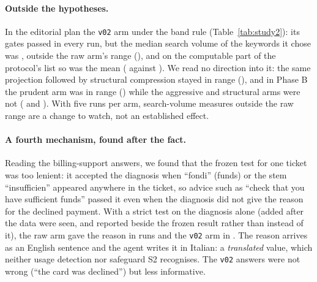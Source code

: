 \paragraph{Outside the hypotheses.} In the editorial plan the \texttt{v02} arm \StudyTwoVtwoHoldsi{} under the band rule
(Table~\ref{tab:study2}): its gates passed in every run, but the median search volume of the keywords it chose was
\StudyTwoVtwoMedianVolumei, outside the raw arm's range (\StudyTwoRawBandVolumei), and on the computable part of the
protocol's list so was the mean (\StudyTwoVtwoMeanVolumei{} against \StudyTwoRawBandMeanVolumei). We read no direction into it: the
same projection followed by structural compression stayed in range (\StudyTwoVtwostructuralMedianVolumei), and in
Phase B the prudent arm was in range (\PhaseBPrudentMedianVolumei) while the aggressive and structural arms were not
(\PhaseBAggressiveMedianVolumei{} and \PhaseBStructuralMedianVolumei). With five runs per arm, search-volume measures
outside the raw range are a change to watch, not an established effect.

\paragraph{A fourth mechanism, found after the fact.} Reading the billing-support answers, we found that the
frozen test for one ticket was too lenient: it accepted the diagnosis when ``fondi'' (funds) or the stem
``insufficien'' appeared anywhere in the ticket, so advice such as ``check that you have sufficient funds'' passed it even when the diagnosis did not
give the reason for the declined payment. With a strict test on the diagnosis alone (added after the data were
seen, and reported beside the frozen result rather than instead of it), the raw arm gave the reason in
\StudyTwoStrictAllRightRaw{} runs and the \texttt{v02} arm in \StudyTwoStrictAllRightVtwo. The reason arrives as an
English sentence and the agent writes it in Italian: a \emph{translated} value, which neither usage detection nor
safeguard S2 recognises. The \texttt{v02} answers were not wrong (``the card was declined'') but less informative.

